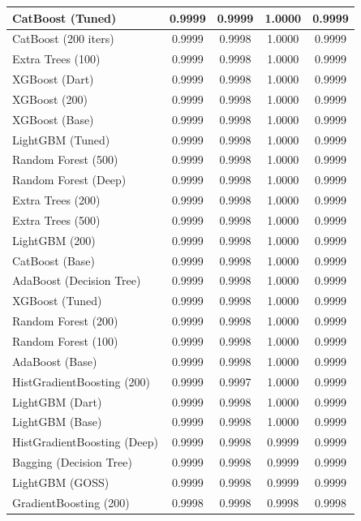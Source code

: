 \begin{small}
\begin{longtable}{|l|c|c|c|c|}
CatBoost (Tuned) & 0.9999 & 0.9999 & 1.0000 & 0.9999 \\ \hline
CatBoost (200 iters) & 0.9999 & 0.9998 & 1.0000 & 0.9999 \\ \hline
Extra Trees (100) & 0.9999 & 0.9998 & 1.0000 & 0.9999 \\ \hline
XGBoost (Dart) & 0.9999 & 0.9998 & 1.0000 & 0.9999 \\ \hline
XGBoost (200) & 0.9999 & 0.9998 & 1.0000 & 0.9999 \\ \hline
XGBoost (Base) & 0.9999 & 0.9998 & 1.0000 & 0.9999 \\ \hline
LightGBM (Tuned) & 0.9999 & 0.9998 & 1.0000 & 0.9999 \\ \hline
Random Forest (500) & 0.9999 & 0.9998 & 1.0000 & 0.9999 \\ \hline
Random Forest (Deep) & 0.9999 & 0.9998 & 1.0000 & 0.9999 \\ \hline
Extra Trees (200) & 0.9999 & 0.9998 & 1.0000 & 0.9999 \\ \hline
Extra Trees (500) & 0.9999 & 0.9998 & 1.0000 & 0.9999 \\ \hline
LightGBM (200) & 0.9999 & 0.9998 & 1.0000 & 0.9999 \\ \hline
CatBoost (Base) & 0.9999 & 0.9998 & 1.0000 & 0.9999 \\ \hline
AdaBoost (Decision Tree) & 0.9999 & 0.9998 & 1.0000 & 0.9999 \\ \hline
XGBoost (Tuned) & 0.9999 & 0.9998 & 1.0000 & 0.9999 \\ \hline
Random Forest (200) & 0.9999 & 0.9998 & 1.0000 & 0.9999 \\ \hline
Random Forest (100) & 0.9999 & 0.9998 & 1.0000 & 0.9999 \\ \hline
AdaBoost (Base) & 0.9999 & 0.9998 & 1.0000 & 0.9999 \\ \hline
HistGradientBoosting (200) & 0.9999 & 0.9997 & 1.0000 & 0.9999 \\ \hline
LightGBM (Dart) & 0.9999 & 0.9998 & 1.0000 & 0.9999 \\ \hline
LightGBM (Base) & 0.9999 & 0.9998 & 1.0000 & 0.9999 \\ \hline
HistGradientBoosting (Deep) & 0.9999 & 0.9998 & 0.9999 & 0.9999 \\ \hline
Bagging (Decision Tree) & 0.9999 & 0.9998 & 0.9999 & 0.9999 \\ \hline
LightGBM (GOSS) & 0.9999 & 0.9998 & 0.9999 & 0.9999 \\ \hline
GradientBoosting (200) & 0.9998 & 0.9998 & 0.9998 & 0.9998 \\ \hline

\end{longtable}
\end{small}
